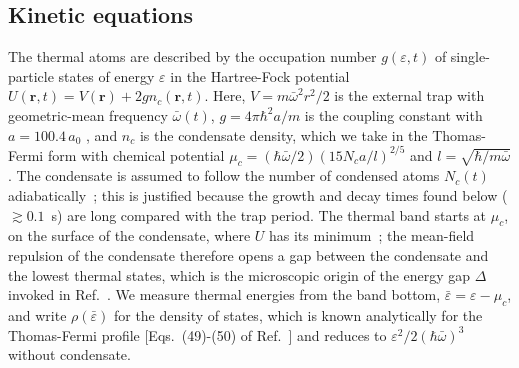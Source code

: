 \subsection{Kinetic equations}
The thermal atoms are described by the occupation number $g(\varepsilon,t)$ of
single-particle states of energy $\varepsilon$ in the Hartree-Fock potential
$U(\mathbf r,t)=V(\mathbf r)+2gn_c(\mathbf r,t)$. Here, $V=m\bar\omega^2r^2/2$ is
the external trap with geometric-mean frequency $\bar\omega(t)$,
$g=4\pi\hbar^2a/m$ is the coupling constant with $a=100.4\,a_0$
\cite{Egorov2013}, and $n_c$ is the condensate density, which we take in the
Thomas-Fermi form with chemical potential
$\mu_c=(\hbar\bar\omega/2)(15N_ca/l)^{2/5}$ and $l=\sqrt{\hbar/m\bar\omega}$. The
condensate is assumed to follow the number of condensed atoms $N_c(t)$
adiabatically~\cite{Bijlsma2000}; this is justified because the growth and
decay times found below ($\gtrsim 0.1$~s) are long compared with the trap
period. The thermal band starts at $\mu_c$, on the surface of the condensate,
where $U$ has its minimum~\cite{Bijlsma2000}; the mean-field repulsion of the
condensate therefore opens a gap between the condensate and the lowest thermal
states, which is the microscopic origin of the energy gap $\Delta$ invoked in
Ref.~\cite{MelladoMunoz2020}. We measure thermal energies from the band bottom,
$\bar\varepsilon=\varepsilon-\mu_c$, and write $\rho(\bar\varepsilon)$ for the
density of states, which is known analytically for the Thomas-Fermi profile
[Eqs.~(49)-(50) of Ref.~\cite{Bijlsma2000}] and reduces to
$\varepsilon^2/2(\hbar\bar\omega)^3$ without condensate.

